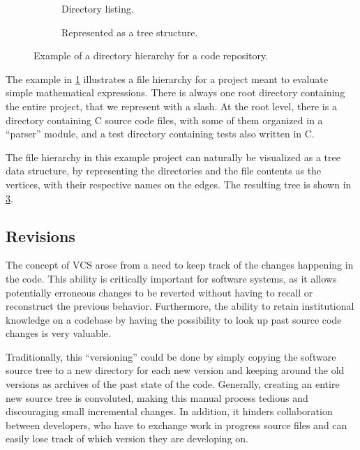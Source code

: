 \begin{figure}
    \centering
    \begin{subfigure}[b]{.40\textwidth}
        \caption{Directory listing.}%
        \label{fig:vcs-dir-flat}
    \end{subfigure}\hfill
    \begin{subfigure}[b]{.58\textwidth}
        \centering
        
        \caption{Represented as a tree structure.}%
        \label{fig:vcs-dir-tree}
    \end{subfigure}
    \caption{Example of a directory hierarchy for a code repository.}
\end{figure}

The example in \cref{fig:vcs-dir-flat} illustrates a file hierarchy for a
project meant to evaluate simple mathematical expressions. There is always one
root directory containing the entire project, that we represent with a slash.
At the root level, there is a directory containing C source code files, with
some of them organized in a ``parser'' module, and a test directory containing
tests also written in C.

The file hierarchy in this example project can naturally be visualized as a
tree data structure, by representing the directories and the file contents as
the vertices, with their respective names on the edges. The resulting tree is
shown in \cref{fig:vcs-dir-tree}.

\subsection{Revisions}

The concept of \acrlong{VCS} arose from a need to keep track of the
changes happening in the code. This ability is critically important for
software systems, as it allows potentially erroneous changes to be reverted
without having to recall or reconstruct the previous behavior. Furthermore, the
ability to retain institutional knowledge on a codebase by having the
possibility to look up past source code changes is very valuable.

Traditionally, this ``versioning'' could be done by simply copying the software
source tree to a new directory for each new version and keeping around the old
versions as archives of the past state of the code. Generally, creating an
entire new source tree is convoluted, making this manual process tedious and
discouraging small incremental changes. In addition, it hinders collaboration
between developers, who have to exchange work in progress source files and can
easily lose track of which version they are developing on.

